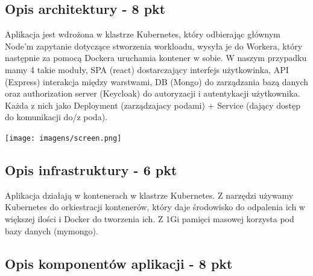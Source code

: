 \documentclass[12pt,a4paper]{article}
\begin{document}
\subsection{Opis architektury - 8 pkt}
\label{sec:introduction}

Aplikacja jest wdrożona w klastrze Kubernetes, który odbierając głównym Node'm zapytanie dotyczące stworzenia workloadu, wysyła je do Workera, który następnie za pomocą Dockera uruchamia kontener w sobie. W naszym przypadku mamy 4 takie moduły, SPA (react) dostarczający interfejs użytkowinka, API (Express) interakcja między warstwami, DB (Mongo) do zarządzania bazą danych oraz authorization server (Keycloak) do autoryzacji i autentykacji użytkownika. Każda z nich jako Deployment (zarządzajacy podami) + Service (dający dostęp do komunikacji do/z poda).

\texttt{[image: imagens/screen.png]}\\
\subsection{Opis infrastruktury - 6 pkt}
\label{sec:Users}


Aplikacja działają w kontenerach w klastrze Kubernetes. Z narzędzi używamy Kubernetes do orkiestracji kontenerów, który daje środowisko do odpalenia ich w większej ilości i Docker do tworzenia ich. Z 1Gi pamięci masowej korzysta pod bazy danych (mymongo). 


\subsection{Opis komponentów aplikacji - 8 pkt}
\label{sec:FunctionalConditions}
\end{document}
